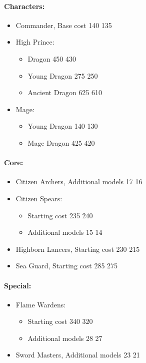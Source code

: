 \begin{multicols}{2}
\paragraph{Characters:}
\begin{itemize}
	\item Commander, Base cost 140 \costdown{} 135
	\item High Prince:
	\begin{itemize}
		\item Dragon 450 \costdown{} 430
		\item Young Dragon 275 \costdown{} 250
		\item Ancient Dragon 625 \costdown{} 610
\end{itemize}
	\item Mage:
	\begin{itemize}
		\item Young Dragon 140 \costdown{} 130
		\item Mage Dragon 425 \costdown{} 420
	\end{itemize}	
\end{itemize}
\columnbreak
\paragraph{Core:}
\begin{itemize}
	\item Citizen Archers, Additional models 17 \costdown{} 16
	\item Citizen Spears:
	\begin{itemize}
		\item Starting cost 235 \costup{} 240
		\item Additional models 15 \costdown{} 14
	\end{itemize}
	\item Highborn Lancers, Starting cost 230 \costdown{} 215
	\item Sea Guard, Starting cost 285 \costdown{} 275
\end{itemize}
\paragraph{Special:}
\begin{itemize}
	\item Flame Wardens:
	\begin{itemize}
	\item Starting cost 340 \costdown{} 320
	\item Additional models 28 \costdown{} 27
	\end{itemize}
	\item Sword Masters, Additional models 23 \costdown{} 21
\end{itemize}

\end{multicols}
